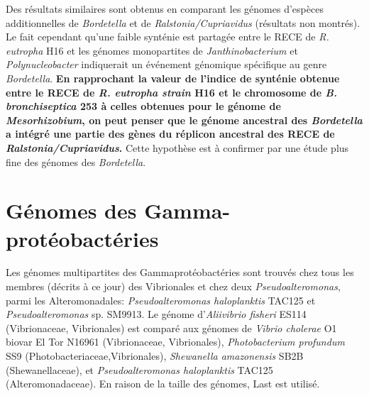 Des résultats similaires sont obtenus en comparant les génomes d'espèces additionnelles de \textit{Bordetella} et de \textit{Ralstonia/Cupriavidus} (résultats non montrés). Le fait cependant qu'une faible synténie est partagée entre le RECE de \textit{R. eutropha} H16 et les génomes monopartites de \textit{Janthinobacterium} et \textit{Polynucleobacter} indiquerait un événement génomique spécifique au genre \textit{Bordetella}. \textbf{\color{orange} En rapprochant la valeur de l'indice de synténie obtenue entre le RECE de \textit{R. eutropha strain} H16 et le chromosome de \textit{B. bronchiseptica} 253 à celles obtenues pour le génome de \textit{Mesorhizobium}, on peut penser que le génome ancestral des \textit{Bordetella} a intégré une partie des gènes du réplicon ancestral des RECE de \textit{Ralstonia/Cupriavidus}.} Cette hypothèse est à confirmer par une étude plus fine des génomes des \textit{Bordetella}.  
     

\section{Génomes des Gamma-protéobactéries}\label{parvibr}
   Les génomes multipartites des Gammaprotéobactéries sont trouvés chez tous les membres (décrits à ce jour) des Vibrionales et chez deux \textit{Pseudoalteromonas}, parmi les Alteromonadales: \textit{Pseudoalteromonas haloplanktis} TAC125 et \textit{Pseudoalteromonas} sp. SM9913. Le génome d'\textit{Aliivibrio fisheri} ES114 (Vibrionaceae, Vibrionales) est comparé aux génomes de \textit{Vibrio cholerae} O1 biovar El Tor N16961  (Vibrionaceae, Vibrionales), \textit{Photobacterium profundum} SS9 (Photobacteriaceae,Vibrionales), \textit{Shewanella amazonensis} SB2B (Shewanellaceae), et \textit{Pseudoalteromonas haloplanktis} TAC125 (Alteromonadaceae). En raison de la taille des génomes, Last est utilisé.
    
